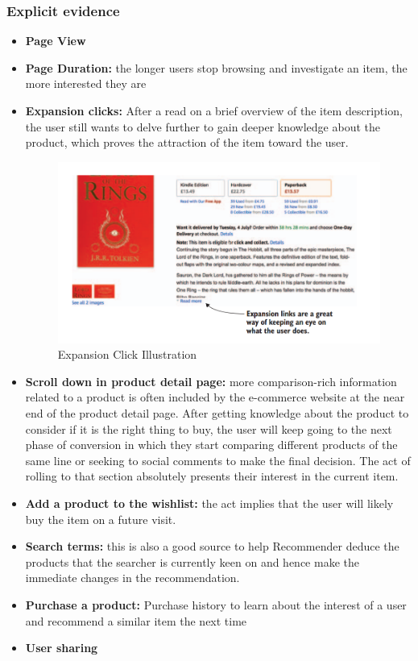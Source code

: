 \subsubsection{Explicit evidence}
\begin{itemize}
    \item \textbf{Page View}
    \item \textbf{Page Duration:} the longer users stop browsing and investigate an item, the more interested they are
    \item \textbf{Expansion clicks:} After a read on a brief overview of the item description, the user still wants to delve further to gain deeper knowledge about the product, which proves the attraction of the item toward the user. 
    \begin{figure}[H]
    \centering
    \includegraphics[width=1\linewidth]{image/Architecture/expansion links.png}
    \caption{Expansion Click Illustration}
    \label{fig:enter-label}
\end{figure}
    \item \textbf{Scroll down in product detail page:} more comparison-rich information related to a product is often included by the e-commerce website at the near end of the product detail page. After getting knowledge about the product to consider if it is the right thing to buy, the user will keep going to the next phase of conversion in which they start comparing different products of the same line or seeking to social comments to make the final decision. The act of rolling to that section absolutely presents their interest in the current item.
    \item \textbf{Add a product to the wishlist:} the act implies that the user will likely buy the item on a future visit.
    \item \textbf{Search terms:} this is also a good source to help Recommender deduce the products that the searcher is currently keen on and hence make the immediate changes in the recommendation.
    \item \textbf{Purchase a product:} Purchase history to learn about the interest of a user and recommend a similar item the next time
    \item \textbf{User sharing}
\end{itemize}

